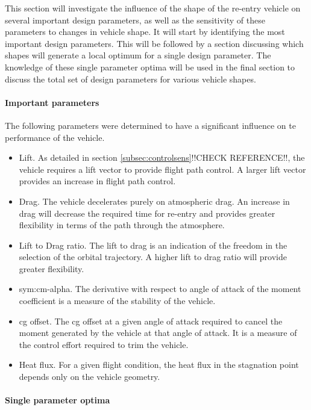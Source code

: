 This section will investigate the influence of the shape of the re-entry vehicle on several important design parameters, as well as the sensitivity of these parameters to changes in vehicle shape. It will start by identifying the most important design parameters. This will be followed by a section discussing which shapes will generate a local optimum for a single design parameter. The knowledge of these single parameter optima will be used in the final section to discuss the total set of design parameters for various vehicle shapes. 

\paragraph{Important parameters}
 The following parameters were determined to have a significant influence on te performance of the vehicle.

\begin{itemize}
	\item{Lift. As detailed in section \ref{subsec:controlsens}!!CHECK REFERENCE!!, the vehicle requires a lift vector to provide flight path control. A larger lift vector provides an increase in flight path control.}
	\item{Drag. The vehicle decelerates purely on atmospheric drag. An increase in drag will decrease the required time for re-entry and provides greater flexibility in terms of the path through the atmosphere. }
	\item{Lift to Drag ratio. The lift to drag is an indication of the freedom in the selection of the orbital trajectory. A higher lift to drag ratio will provide greater flexibility.}
	\item{\gls{sym:cm-alpha}. The derivative with respect to angle of attack of the moment coefficient is a measure of the stability of the vehicle. }
	\item{\gls{cg} offset}. The \gls{cg} offset at a given angle of attack required to cancel the moment generated by the vehicle at that angle of attack. It is a measure of the control effort required to trim the vehicle. 
	\item{Heat flux. For a given flight condition, the heat flux in the stagnation point depends only on the vehicle geometry.  }
\end{itemize}


\paragraph{Single parameter optima}


